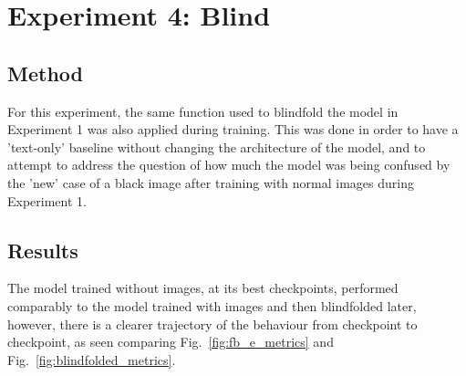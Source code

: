 \section{Experiment 4: Blind}
\label{sec:exp_4}
\subsection{Method}
For this experiment, the same function used to blindfold the model in Experiment 1 was also applied during training. This was done in order to have a 'text-only' baseline without changing the architecture of the model, and to attempt to address the question of how much the model was being confused by the 'new' case of a black image after training with normal images during Experiment 1. 

\subsection{Results}
The model trained without images, at its best checkpoints, performed comparably to the model trained with images and then blindfolded later, however, there is a clearer trajectory of the behaviour from checkpoint to checkpoint, as seen comparing Fig.~\ref{fig:fb_e_metrics} and Fig.~\ref{fig:blindfolded_metrics}.

